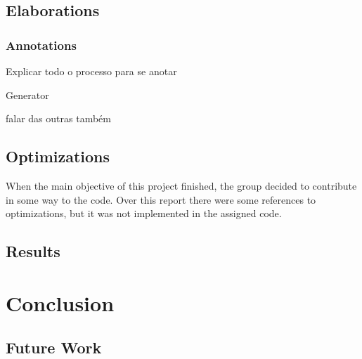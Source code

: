 \documentclass[11pt]{report}
\begin{document}
	\section{Elaborations}
	
	\par%
	
	
	\subsection{Annotations}
	
	\par Explicar todo o processo para se anotar
	
	\par Generator
	
	\par falar das outras também
	
	\section{Optimizations}
	
	\par When the main objective of this project finished, the group decided to contribute in some way to the code. Over this report there were some references to optimizations, but it was not implemented in the assigned code. 
	
	\section{Results}
	



\chapter{Conclusion}

	\section{Future Work} 

\newpage
	
{}

	
\end{document}

